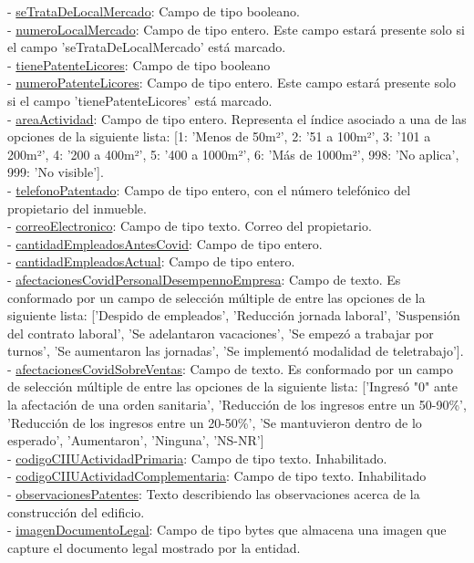 - \underline{seTrataDeLocalMercado}: Campo de tipo booleano. \\
- \underline{numeroLocalMercado}: Campo de tipo entero. Este campo estará presente solo si el campo 'seTrataDeLocalMercado' está marcado. \\
- \underline{tienePatenteLicores}: Campo de tipo booleano \\
- \underline{numeroPatenteLicores}: Campo de tipo entero. Este campo estará presente solo si el campo 'tienePatenteLicores' está marcado. \\
- \underline{areaActividad}: Campo de tipo entero. Representa el índice asociado a una de las opciones de la siguiente lista: [1: 'Menos de 50m²', 2: '51 a 100m²', 3: '101 a 200m²', 4: '200 a 400m²', 5: '400 a 1000m²', 6: 'Más de 1000m²', 998: 'No aplica', 999: 'No visible']. \\
- \underline{telefonoPatentado}: Campo de tipo entero, con el número telefónico del propietario del inmueble. \\
- \underline{correoElectronico}: Campo de tipo texto. Correo del propietario. \\
- \underline{cantidadEmpleadosAntesCovid}: Campo de tipo entero. \\
- \underline{cantidadEmpleadosActual}: Campo de tipo entero. \\
- \underline{afectacionesCovidPersonalDesempennoEmpresa}: Campo de texto. Es conformado por un campo de selección múltiple de entre las opciones de la siguiente lista: ['Despido de empleados', 'Reducción jornada laboral', 'Suspensión del contrato laboral', 'Se adelantaron vacaciones', 'Se empezó a trabajar por turnos', 'Se aumentaron las jornadas', 'Se implementó modalidad de teletrabajo']. \\
- \underline{afectacionesCovidSobreVentas}: Campo de texto. Es conformado por un campo de selección múltiple de entre las opciones de la siguiente lista: ['Ingresó "0" ante la afectación de una orden sanitaria', 'Reducción de los ingresos entre un 50-90\%', 'Reducción de los ingresos entre un 20-50\%', 'Se mantuvieron dentro de lo esperado', 'Aumentaron', 'Ninguna', 'NS-NR'] \\
- \underline{codigoCIIUActividadPrimaria}: Campo de tipo texto. Inhabilitado. \\
- \underline{codigoCIIUActividadComplementaria}: Campo de tipo texto. Inhabilitado \\
- \underline{observacionesPatentes}: Texto describiendo las observaciones acerca de la construcción del edificio. \\
- \underline{imagenDocumentoLegal}: Campo de tipo bytes que almacena una imagen que capture el documento legal mostrado por la entidad. \\

